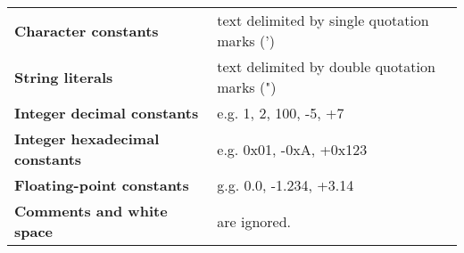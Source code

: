 \vspace*{1cm}

\begin{tabular}{ll}
\textbf{Character constants}            & text delimited by single quotation marks (') \\
\textbf{String literals}                & text delimited by double quotation marks (") \\
\textbf{Integer decimal constants}      & e.g. 1, 2, 100, -5, +7                       \\
\textbf{Integer hexadecimal constants}  & e.g. 0x01, -0xA, +0x123                      \\
\textbf{Floating-point constants}       & g.g. 0.0, -1.234, +3.14                      \\
\textbf{Comments and white space}       & are ignored.                                 \\
\end{tabular}

